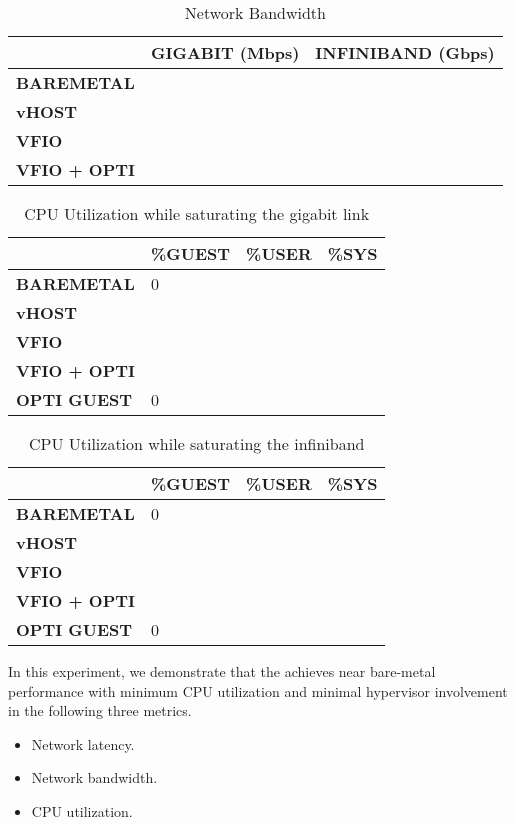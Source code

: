 \begin{table}
\begin{tabular}{|l|p{2cm}|p{2cm}|}
\hline
\textbf{} & \textbf{GIGABIT (Mbps)} & \textbf{INFINIBAND (Gbps)} \\ \hline
\textbf{BAREMETAL} & & \\ \hline
\textbf{vHOST} & & \\ \hline
\textbf{VFIO} & & \\ \hline
\textbf{VFIO + OPTI} & & \\
\hline
\end{tabular}
\caption{Network Bandwidth}
\label{tab:network_bandwidth}
\end{table}

\begin{table}
\begin{tabular}{|l|l|l|l|}
\hline
\textbf{} & \textbf{\%GUEST} & \textbf{\%USER} & \textbf{\%SYS} \\ \hline
\textbf{BAREMETAL} & 0 & & \\ \hline
\textbf{vHOST} & & & \\ \hline
\textbf{VFIO} & & & \\ \hline
\textbf{VFIO + OPTI} & & & \\ \hline
\textbf{OPTI GUEST} & 0 & & \\
\hline
\end{tabular}
\caption{CPU Utilization while saturating the gigabit link}
\label{tab:cpu_utilization_1gbps}
\end{table}

\begin{table}
\begin{tabular}{|l|l|l|l|}
\hline
\textbf{} & \textbf{\%GUEST} & \textbf{\%USER} & \textbf{\%SYS} \\ \hline
\textbf{BAREMETAL} & 0 & & \\ \hline
\textbf{vHOST} & & & \\ \hline
\textbf{VFIO} & & & \\ \hline
\textbf{VFIO + OPTI} & & & \\ \hline
\textbf{OPTI GUEST} & 0 & & \\
\hline
\end{tabular}
\caption{CPU Utilization while saturating the infiniband}
\label{tab:cpu_utilization_40gbps}
\end{table}

In this experiment, we demonstrate that the \na achieves near
bare-metal performance with minimum CPU utilization and
minimal hypervisor involvement in the following three metrics.
\begin{itemize}
  \item Network latency.
  \item Network bandwidth.
  \item CPU utilization.
\end{itemize}


